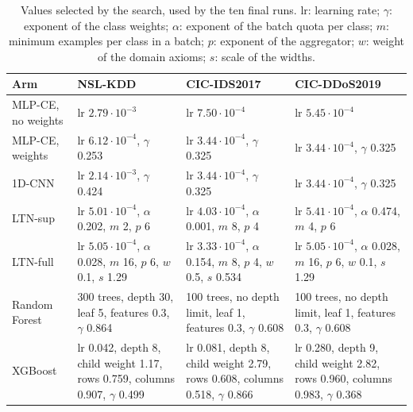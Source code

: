 \begin{table}[htbp]
\centering
\footnotesize
\caption{Values selected by the search, used by the ten final runs. lr: learning rate; $\gamma$:
exponent of the class weights; $\alpha$: exponent of the batch quota per class; $m$: minimum
examples per class in a batch; $p$: exponent of the aggregator; $w$: weight of the domain axioms;
$s$: scale of the widths.}
\label{tab:tuning-selected}
\setlength{\tabcolsep}{3pt}
\begin{tabular}{@{}p{2.2cm}p{3.6cm}p{3.6cm}p{3.6cm}@{}}
\toprule
Arm & NSL-KDD & CIC-IDS2017 & CIC-DDoS2019 \\
\midrule
MLP-CE, no weights & lr $2.79\cdot10^{-3}$ & lr $7.50\cdot10^{-4}$ & lr $5.45\cdot10^{-4}$ \\
MLP-CE, weights & lr $6.12\cdot10^{-4}$, $\gamma$ 0.253 & lr $3.44\cdot10^{-4}$, $\gamma$ 0.325 & lr $3.44\cdot10^{-4}$, $\gamma$ 0.325 \\
1D-CNN & lr $2.14\cdot10^{-3}$, $\gamma$ 0.424 & lr $3.44\cdot10^{-4}$, $\gamma$ 0.325 & lr $3.44\cdot10^{-4}$, $\gamma$ 0.325 \\
LTN-sup & lr $5.01\cdot10^{-4}$, $\alpha$ 0.202, $m$ 2, $p$ 6 & lr $4.03\cdot10^{-4}$, $\alpha$ 0.001, $m$ 8, $p$ 4 & lr $5.41\cdot10^{-4}$, $\alpha$ 0.474, $m$ 4, $p$ 6 \\
LTN-full & lr $5.05\cdot10^{-4}$, $\alpha$ 0.028, $m$ 16, $p$ 6, $w$ 0.1, $s$ 1.29 & lr $3.33\cdot10^{-4}$, $\alpha$ 0.154, $m$ 8, $p$ 4, $w$ 0.5, $s$ 0.534 & lr $5.05\cdot10^{-4}$, $\alpha$ 0.028, $m$ 16, $p$ 6, $w$ 0.1, $s$ 1.29 \\
Random Forest & 300 trees, depth 30, leaf 5, features 0.3, $\gamma$ 0.864 & 100 trees, no depth limit, leaf 1, features 0.3, $\gamma$ 0.608 & 100 trees, no depth limit, leaf 1, features 0.3, $\gamma$ 0.608 \\
XGBoost & lr 0.042, depth 8, child weight 1.17, rows 0.759, columns 0.907, $\gamma$ 0.499 & lr 0.081, depth 8, child weight 2.79, rows 0.608, columns 0.518, $\gamma$ 0.866 & lr 0.280, depth 9, child weight 2.82, rows 0.960, columns 0.983, $\gamma$ 0.368 \\
\bottomrule
\end{tabular}
\end{table}
